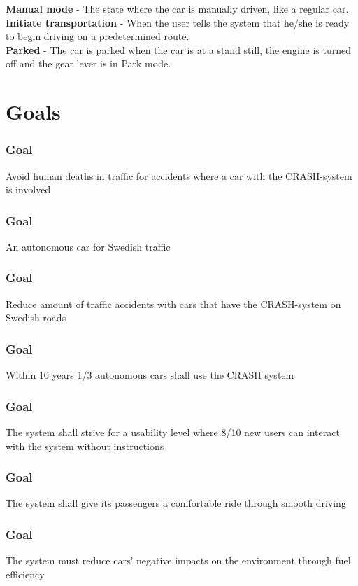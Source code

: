 \documentclass{article}
\begin{document}
\textbf{Manual mode} - The state where the car is manually driven, like a regular car.\\
\textbf{Initiate transportation} - When the user tells the system that he/she is ready to begin driving on a predetermined route. \\
\textbf{Parked} - The car is parked when the car is at a stand still, the engine is turned off and the gear lever is in Park mode.

\section{Goals}
    \subsubsection{Goal}
\hfill \break 
\- \- \-Avoid human deaths in traffic for accidents where a car with the CRASH-system is involved
    \subsubsection{Goal}
\hfill \break 
\- \- \-An autonomous car for Swedish traffic
    \subsubsection{Goal}
\hfill \break 
\- \- \-Reduce amount of traffic accidents with cars that have the CRASH-system on Swedish roads
    \subsubsection{Goal}
\hfill \break 
\- \- \-Within 10 years 1/3 autonomous cars shall use the CRASH system
    \subsubsection{Goal}
\hfill \break 
\- \- \-The system shall strive for a usability level where 8/10 new users can interact with the system without instructions
    \subsubsection{Goal}
\hfill \break 
\- \- \-The system shall give its passengers a comfortable ride through smooth driving
    \subsubsection{Goal}
\hfill \break 
\- \- \-The system must reduce cars' negative impacts on the environment through fuel efficiency
\bigskip
\end{document}
